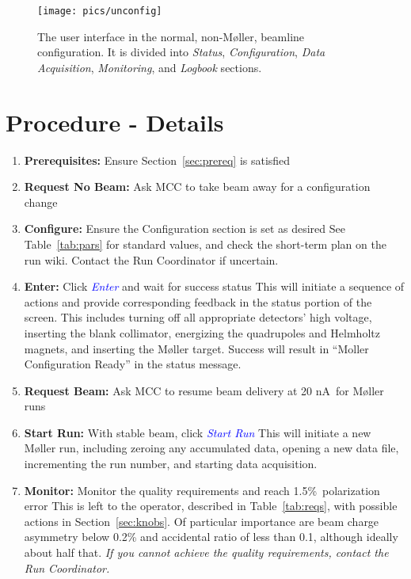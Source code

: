 \documentclass[amsmath,amssymb,notitlepage,12pt]{revtex4}
\newcommand{\ibeam}{20 nA\ }
\newcommand{\easy}{1.5\%}
\begin{document}
\begin{figure}[htbp]\centering
    \texttt{[image: pics/unconfig]}
    \caption{\label{fig:beamline}The user interface in the normal, non-M{\o}ller, beamline configuration.  It is divided into {\em Status}, {\em Configuration}, {\em Data Acquisition}, {\em Monitoring}, and {\em Logbook} sections.\label{fig:unconfig}}
\end{figure}

\section{Procedure - Details}
\begin{enumerate}\singlespacing
\item {\bf Prerequisites:}  Ensure Section~\ref{sec:prereq} is satisfied
\item {\bf Request No Beam:}  Ask MCC to take beam away for a configuration change
\item {\bf Configure:}  Ensure the Configuration section is set as desired
\subitem See Table~\ref{tab:pars} for standard values, and check the short-term plan on the run wiki.  Contact the Run Coordinator if uncertain.
\item {\bf Enter:} Click \textcolor{blue}{\em Enter} and wait for success status
\subitem This will initiate a sequence of actions and provide corresponding feedback in the status portion of the screen.  This includes turning off all appropriate detectors' high voltage, inserting the blank collimator, energizing the quadrupoles and Helmholtz magnets, and inserting the M{\o}ller target.  Success will result in ``Moller Configuration Ready'' in the status message.
\item {\bf Request Beam:} Ask MCC to resume beam delivery at \ibeam for M{\o}ller runs
\item {\bf Start Run:} With stable beam, click \textcolor{blue}{\em Start Run}
    \subitem This will initiate a new M{\o}ller run, including zeroing any accumulated data, opening a new data file, incrementing the run number, and starting data acquisition.
\item {\bf Monitor:} Monitor the quality requirements and reach \easy\ polarization error
    \subitem This is left to the operator, described in Table~\ref{tab:reqs}, with possible actions in Section~\ref{sec:knobs}.  Of particular importance are beam charge asymmetry below 0.2\% and accidental ratio of less than 0.1, although ideally about half that.  {\em If you cannot achieve the quality requirements, contact the Run Coordinator.}

\end{enumerate}
\end{document}
